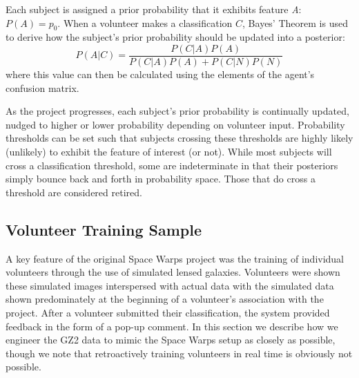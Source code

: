 \documentclass[twocolumn]{aastex6}
\newcommand{\A}{\textit{A}}
\begin{document}
Each subject is assigned a prior probability that it exhibits feature \A: $P(A) = p_0$. 
When a volunteer makes a classification $C$, Bayes' Theorem is used to derive how 
the subject's prior probability should be updated into a posterior: 
\begin{equation}
P(A|C) = \frac{ P(C|A) P(A) }{P(C|A) P(A) + P(C|N) P(N)}
\end{equation}
where this value can then be calculated using the elements of the agent's 
confusion matrix. 


As the project progresses, each subject's prior probability is continually updated,
 nudged to higher or lower probability depending on volunteer input.
Probability thresholds can be set such that subjects crossing these thresholds 
are highly likely (unlikely) to exhibit the feature of interest (or not). While most subjects
will cross a classification threshold, some are indeterminate in that their posteriors 
simply bounce back and forth in probability space. 
Those that do cross a threshold are considered retired. 



\subsection{Volunteer Training Sample}\label{sec: training sample}

A key feature of the original Space Warps project was the training of 
individual volunteers through the use of simulated lensed galaxies. Volunteers were 
shown these simulated images interspersed with actual data with the simulated data shown
predominately at the beginning of a volunteer's association with the project. 
After a volunteer submitted their 
classification, the system provided feedback in the form of a pop-up comment. 
In this section we describe how we engineer the GZ2 data to mimic the Space 
Warps setup as closely as possible, though we note that retroactively training 
volunteers in real time is obviously not possible. 
\end{document}
